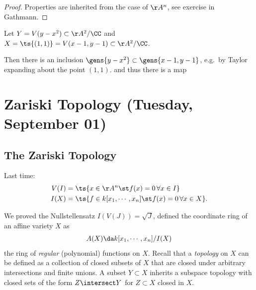 \begin{proof}

Properties are inherited from the case of \(\AA^n\), see exercise in
Gathmann.

\end{proof}

\begin{example}

Let \(Y = V(y-x^2) \subset \AA^2/\CC\) and
\(X = \ts{(1, 1)} = V(x-1, y-1)\subset \AA^2/\CC\).

Then there is an inclusion \(\gens{y-x^2} \subset \gens{x-1, y-1}\),
e.g.~by Taylor expanding about the point \((1, 1)\). and thus there is a
map

\begin{center}
\end{center}

\end{example}

\hypertarget{zariski-topology-tuesday-september-01}{%
\section{Zariski Topology (Tuesday, September
01)}\label{zariski-topology-tuesday-september-01}}

\hypertarget{the-zariski-topology}{%
\subsection{The Zariski Topology}\label{the-zariski-topology}}

Last time:
\begin{align*}  
V(I) &= \ts{x\in \AA^n \st f(x) = 0 \, \forall x\in I} \\
I(X) &= \ts{f\in k[x_1, \cdots, x_n] \st f(x) = 0\, \forall x\in X}
.\end{align*}

We proved the Nullstellensatz \(I(V(J)) = \sqrt{J}\), defined the
coordinate ring of an affine variety \(X\) as
\begin{align*}
A(X) \da k[x_1, \cdots, x_n] / I(X)
\end{align*} the ring of \emph{regular} (polynomial) functions on \(X\).
Recall that a \emph{topology} on \(X\) can be defined as a collection of
closed subsets of \(X\) that are closed under arbitrary intersections
and finite unions. A subset \(Y\subset X\) inherits a subspace topology
with closed sets of the form \(Z\intersect Y\) for \(Z\subset X\) closed
in \(X\).

